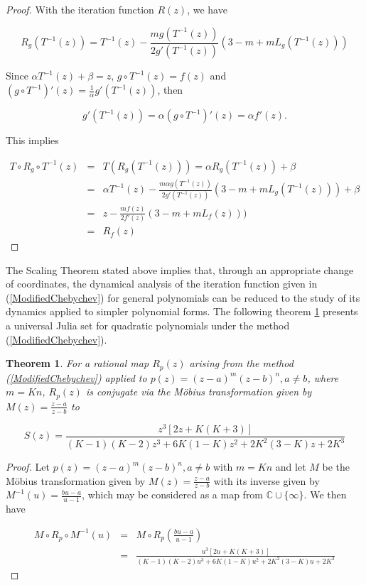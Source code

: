 \documentclass{article}
\newtheorem{theorem}{Theorem}[section]
\theoremstyle{definition}
\theoremstyle{remark}
\begin{document}
\begin{proof}
	With the iteration function $R(z)$, we have

	$$R_g(T^{-1}(z)) = T^{-1}(z)-  \frac{mg\left(T^{-1}(z)\right)}{2g'\left(T^{-1}(z)\right)}\left(3-m+m L_{g}\left(T^{-1}(z)\right)\right) \nonumber$$

	Since
	$\alpha  T^{-1}(z)+\beta=z$,  $g\circ T^{-1}(z)=f(z)$ and $\left(g\circ T^{-1}\right)'(z)=\frac{1}{\alpha}g'\left(T^{-1}(z)\right)$, then

	 $$g'\left(T^{-1}(z)\right)=\alpha\left(g\circ T^{-1}\right)'(z)=\alpha f'(z).$$

	This implies

	\begin{eqnarray*}
		T\circ R_g\circ T^{-1}(z) &=& T\left(R_g(T^{-1}(z))\right)=\alpha R_g\left(T^{-1}(z)\right)+\beta \\
		&=&\alpha   T^{-1}(z)-  \frac{m \alpha g\left(T^{-1}(z)\right)}{2g'\left(T^{-1}(z)\right)}\left(3-m+m L_{g}\left(T^{-1}(z)\right)\right) +\beta\\
		&=&z-\frac{mf(z)}{2f'(z)}\left(3-m+mL_f(z)\right))\\
		&=&R_f(z)
	\end{eqnarray*}

\end{proof}

The Scaling Theorem stated above implies that, through an appropriate change of coordinates, the dynamical analysis of the iteration function given in (\ref{ModifiedChebychev}) for general polynomials can be reduced to the study of its dynamics applied to simpler polynomial forms. The following theorem \ref{t:mio} presents a universal Julia set for quadratic polynomials under the method (\ref{ModifiedChebychev}).

\begin{theorem}\label{t:mio} For a rational map  $R_p(z)$ arising from the method (\ref{ModifiedChebychev}) applied to $p(z)=(z-a)^m(z-b)^n, a\neq b$, where $m=Kn$,  $R_p(z)$  is conjugate via the M\"{o}bius transformation given by $M(z)=\frac{z-a}{z-b}$ to

	\begin{equation}\label{S}
		S(z)=\frac{z^3[2z+K(K+3)]}{(K-1)(K-2)z^3+6K(1-K)z^2+2K^2(3-K)z+2K^3}
	\end{equation}

\end{theorem}

\begin{proof}
	Let $p(z)=(z-a)^m(z-b)^n, a\neq b$  with  $m=Kn$ and let $M$ be the M\"{o}bius transformation  given by $M(z)=\frac{z-a}{z-b}$ with its inverse  given by $M^{-1}(u)=\frac{bu-a}{u-1}$, which may be considered as a map from $\mathbb{C}\cup\{\infty\}$. We then have

	\begin{eqnarray*}
		M\circ R_p\circ M^{-1}(u)&=&M\circ R_p\left(\frac{bu-a}{u-1}\right)\nonumber\\
		&=&\frac{u^3[2u+K(K+3)]}{(K-1)(K-2)u^3+6K(1-K)u^2+2K^2(3-K)u+2K^3}
	\end{eqnarray*}
\end{proof}
\end{document}
